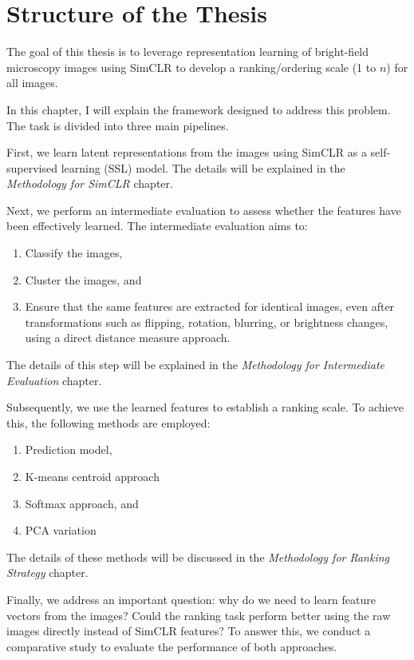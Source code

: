 \chapter{Structure of the Thesis}\label{ch:Structure of the Thesis}

The goal of this thesis is to leverage representation learning of bright-field microscopy images using SimCLR to develop a ranking/ordering scale 
(1 to \( n \)) for all images. 

In this chapter, I will explain the framework designed to address this problem. The task is divided into three main pipelines.

First, we learn latent representations from the images using SimCLR as a self-supervised learning (SSL) model. The details will be explained in the 
\textit{Methodology for SimCLR} chapter.

Next, we perform an intermediate evaluation to assess whether the features have been effectively learned. The intermediate evaluation aims to:

\begin{enumerate}
    \item Classify the images,
    \item Cluster the images, and
    \item Ensure that the same features are extracted for identical images, even after transformations such as flipping, rotation, blurring, or brightness changes,
     using a direct distance measure approach.
\end{enumerate}

The details of this step will be explained in the \textit{Methodology for Intermediate Evaluation} chapter.

Subsequently, we use the learned features to establish a ranking scale. To achieve this, the following methods are employed:

\begin{enumerate}
    \item Prediction model,
    \item K-means centroid approach
    \item Softmax approach, and
    \item PCA variation
\end{enumerate}

The details of these methods will be discussed in the \textit{Methodology for Ranking Strategy} chapter.

Finally, we address an important question: why do we need to learn feature vectors from the images? Could the ranking task perform better using the raw images 
directly instead of SimCLR features? To answer this, we conduct a comparative study to evaluate the performance of both approaches.

